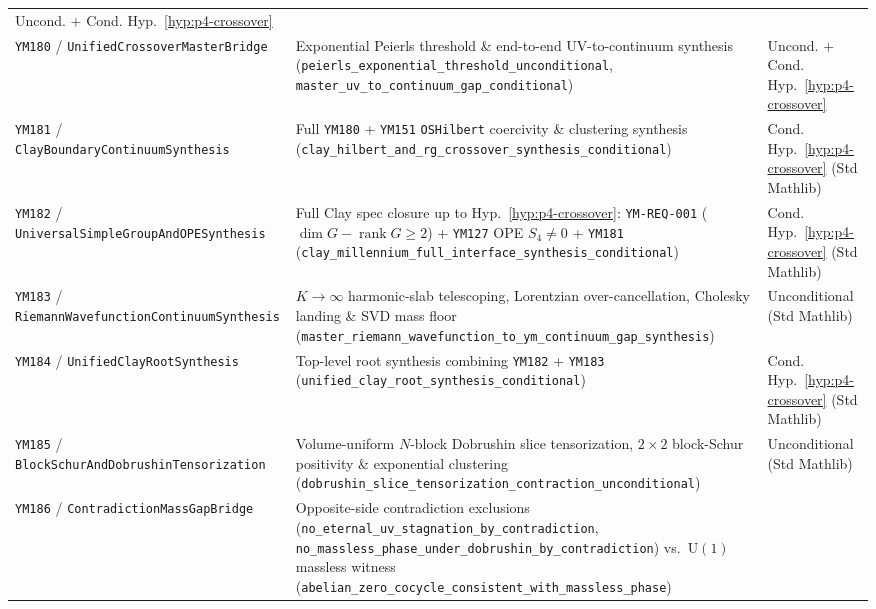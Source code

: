 \documentclass[11pt,a4paper]{article}
\begin{document}
\begin{table}[ht]
\begin{tabular}{@{}p{4.3cm}p{6.6cm}p{3.4cm}@{}}
Uncond. + Cond. Hyp.~\ref{hyp:p4-crossover} \\
\texttt{YM180} / \texttt{UnifiedCrossover\allowbreak MasterBridge} &
Exponential Peierls threshold \& end-to-end UV-to-continuum synthesis (\texttt{peierls\_\allowbreak exponential\_\allowbreak threshold\_\allowbreak unconditional}, \texttt{master\_\allowbreak uv\_\allowbreak to\_\allowbreak continuum\_\allowbreak gap\_\allowbreak conditional}) &
Uncond. + Cond. Hyp.~\ref{hyp:p4-crossover} \\
\texttt{YM181} / \texttt{ClayBoundary\allowbreak ContinuumSynthesis} &
Full \texttt{YM180} + \texttt{YM151} \texttt{OSHilbert} coercivity \& clustering synthesis (\texttt{clay\_\allowbreak hilbert\_\allowbreak and\_\allowbreak rg\_\allowbreak crossover\_\allowbreak synthesis\_\allowbreak conditional}) &
Cond. Hyp.~\ref{hyp:p4-crossover} (Std Mathlib) \\
\texttt{YM182} / \texttt{UniversalSimpleGroup\allowbreak AndOPESynthesis} &
Full Clay spec closure up to Hyp.~\ref{hyp:p4-crossover}: \texttt{YM-REQ-001} ($\dim G - \operatorname{rank} G \ge 2$) + \texttt{YM127} OPE $S_4 \ne 0$ + \texttt{YM181} (\texttt{clay\_\allowbreak millennium\_\allowbreak full\_\allowbreak interface\_\allowbreak synthesis\_\allowbreak conditional}) &
Cond. Hyp.~\ref{hyp:p4-crossover} (Std Mathlib) \\
\texttt{YM183} / \texttt{RiemannWavefunction\allowbreak ContinuumSynthesis} &
$K{\to}\infty$ harmonic-slab telescoping, Lorentzian over-cancellation, Cholesky landing \& SVD mass floor (\texttt{master\_\allowbreak riemann\_\allowbreak wavefunction\_\allowbreak to\_\allowbreak ym\_\allowbreak continuum\_\allowbreak gap\_\allowbreak synthesis}) &
Unconditional (Std Mathlib) \\
\texttt{YM184} / \texttt{UnifiedClayRoot\allowbreak Synthesis} &
Top-level root synthesis combining \texttt{YM182} + \texttt{YM183} (\texttt{unified\_\allowbreak clay\_\allowbreak root\_\allowbreak synthesis\_\allowbreak conditional}) &
Cond. Hyp.~\ref{hyp:p4-crossover} (Std Mathlib) \\
\texttt{YM185} / \texttt{BlockSchurAnd\allowbreak DobrushinTensorization} &
Volume-uniform $N$-block Dobrushin slice tensorization, $2\times 2$ block-Schur positivity \& exponential clustering (\texttt{dobrushin\_\allowbreak slice\_\allowbreak tensorization\_\allowbreak contraction\_\allowbreak unconditional}) &
Unconditional (Std Mathlib) \\
\texttt{YM186} / \texttt{Contradiction\allowbreak MassGapBridge} &
Opposite-side contradiction exclusions (\texttt{no\_\allowbreak eternal\_\allowbreak uv\_\allowbreak stagnation\_\allowbreak by\_\allowbreak contradiction}, \texttt{no\_\allowbreak massless\_\allowbreak phase\_\allowbreak under\_\allowbreak dobrushin\_\allowbreak by\_\allowbreak contradiction}) vs.\ $\mathrm{U}(1)$ massless witness (\texttt{abelian\_\allowbreak zero\_\allowbreak cocycle\_\allowbreak consistent\_\allowbreak with\_\allowbreak massless\_\allowbreak phase}) &

\end{tabular}
\end{table}
\end{document}
